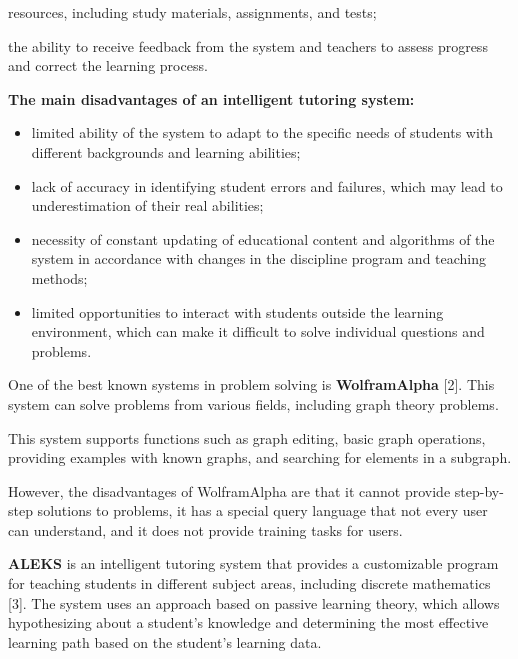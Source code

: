 \documentclass[twocolumn]{scndocument}
\begin{document}
\setcounter{page}{222}

\begin{list}{}{\leftmargin=2.5em \itemsep = 0pt}
    \item[\hspace{1em}]resources, including study materials, assignments, and tests;
    \item the ability to receive feedback from the system and teachers to assess progress and correct the learning process.
\end{list}
\textbf{The main disadvantages of an intelligent tutoring system:}
\begin{itemize}[noitemsep]
    \item limited ability of the system to adapt to the specific needs of students with different backgrounds and learning abilities;
    \item lack of accuracy in identifying student errors and failures, which may lead to underestimation of their real abilities;
    \item necessity of constant updating of educational content and algorithms of the system in accordance with changes in the discipline program and teaching methods;
    \item limited opportunities to interact with students outside the learning environment, which can make it difficult to solve individual questions and problems.
\end{itemize}

One of the best known systems in problem solving is \textbf{WolframAlpha} [2]. This system can solve problems from various fields, including graph theory problems.

This system supports functions such as graph editing, basic graph operations, providing examples with known graphs, and searching for elements in a subgraph.

However, the disadvantages of WolframAlpha are that it cannot provide step-by-step solutions to problems, it has a special query language that not every user can understand, and it does not provide training tasks for users.

\textbf{ALEKS} is an intelligent tutoring system that provides a customizable program for teaching students in different subject areas, including discrete mathematics [3]. The system uses an approach based on passive learning theory, which allows hypothesizing about a student’s knowledge and determining the most effective learning path based on the student’s learning data.
\end{document}
